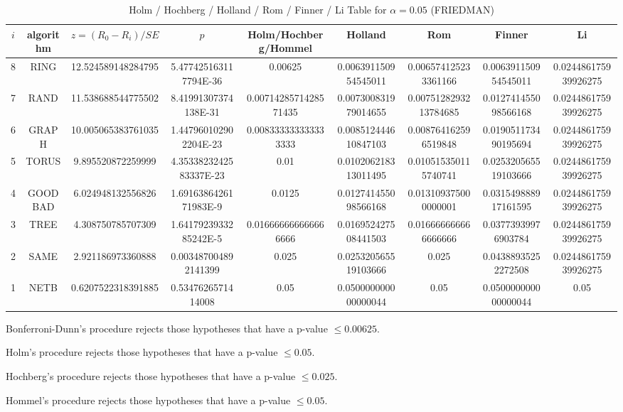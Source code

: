 \documentclass[a4paper,10pt]{article}
\begin{document}
\begin{landscape}
\begin{table}[!htp]
\begin{tabular}{
|r|r|r|r|r|r|r|r|r|r|}
\end{tabular}
\end{table}

\newpage

\begin{table}[!htp]
\centering\scriptsize
\caption{Holm / Hochberg / Holland / Rom / Finner / Li Table for $\alpha=0.05$ (FRIEDMAN)}
\begin{tabular}{ccccccccc}
$i$&algorithm&$z=(R_0 - R_i)/SE$&$p$&Holm/Hochberg/Hommel&Holland&Rom&Finner&Li\\
\hline
8& RING&12.524589148284795&5.477425163117794E-36&0.00625&0.006391150954545011&0.006574125233361166&0.006391150954545011&0.024486175939926275\\
7& RAND&11.538688544775502&8.41991307374138E-31&0.0071428571428571435&0.007300831979014655&0.0075128293213784685&0.012741455098566168&0.024486175939926275\\
6& GRAPH&10.005065383761035&1.447960102902204E-23&0.008333333333333333&0.008512444610847103&0.008764162596519848&0.019051173490195694&0.024486175939926275\\
5& TORUS&9.895520872259999&4.3533823242583337E-23&0.01&0.010206218313011495&0.010515350115740741&0.025320565519103666&0.024486175939926275\\
4& GOODBAD&6.024948132556826&1.6916386426171983E-9&0.0125&0.012741455098566168&0.013109375000000001&0.031549888917161595&0.024486175939926275\\
3& TREE&4.308750785707309&1.6417923933285242E-5&0.016666666666666666&0.016952427508441503&0.016666666666666666&0.03773939976903784&0.024486175939926275\\
2& SAME&2.921186973360888&0.003487004892141399&0.025&0.025320565519103666&0.025&0.04388935252272508&0.024486175939926275\\
1& NETB&0.6207522318391885&0.5347626571414008&0.05&0.050000000000000044&0.05&0.050000000000000044&0.05\\
\hline
\end{tabular}
\end{table}
Bonferroni-Dunn's procedure rejects those hypotheses that have a p-value $\le0.00625$.


Holm's procedure rejects those hypotheses that have a p-value $\le0.05$.


Hochberg's procedure rejects those hypotheses that have a p-value $\le0.025$.


Hommel's procedure rejects those hypotheses that have a p-value $\le0.05$.



\end{landscape}
\end{document}
